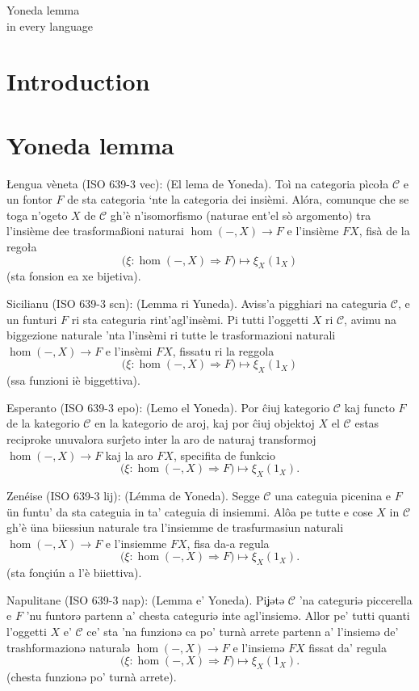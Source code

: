 \documentclass{article}
\def\faire{\todo[inline]{TODO!}}
\newcommand{\tran}[3]{%
	\noindent\textsf{#1:} (#2). #3%
	\medskip\newline
}
\begin{document}
\begin{center}
Yoneda lemma \\
in every language
\end{center}
\section{Introduction}
\faire
\section{Yoneda lemma}
\faire

\tran{{\L}engua vèneta (ISO 639-3 vec)}{El lema de Yoneda}{
	Toì na categoria pìco{\l}a $\mathcal C$ e un fontor $F$ de sta categoria `nte la categoria dei insièmi. Al\'ora, comunque che se toga n'ogeto $X$ de $\mathcal C$ gh'è n'isomorfismo (naturae ent'el sò argomento) tra l'insième dee trasforma{\ss}ioni naturai $\hom(-,X)\to F$ e l'insième $FX$, fisà de la rego{\l}a
	\[
	\Big(\xi : \hom(-,X)\Rightarrow F\Big) \mapsto \xi_X(1_X)
	\]
	(sta fonsion ea xe bijetiva).
}
\tran{Sicilianu (ISO 639-3 scn)}{Lemma ri Yuneda}{
	Aviss'a pigghiari na categuria $\mathcal C$, e un funturi $F$ ri sta categuria rint'agl'insèmi. Pi tutti l'oggetti $X$ ri $\mathcal C$, avimu na biggezione naturale 'nta l'insèmi ri tutte le trasformazioni naturali $\hom(-,X)\to F$ e l'insèmi $FX$, fissatu ri la reggola
	\[
		\Big(\xi : \hom(-,X)\Rightarrow F\Big) \mapsto \xi_X(1_X)
	\]
	(ssa funzioni iè biggettiva).
}
\tran{Esperanto (ISO 639-3 epo)}{Lemo el Yoneda}{
	Por \^{c}iuj kategorio $\mathcal C$ kaj functo $F$ de la kategorio $\mathcal C$ en la kategorio de aroj, kaj por \^{c}iuj objektoj $X$ el $\mathcal C$ estas reciproke unuvalora sur\^{j}eto inter la aro de naturaj transformoj $\hom(-,X)\to F$ kaj la aro $FX$, specifita de funkcio
	\[
		\Big(\xi : \hom(-,X)\Rightarrow F\Big) \mapsto \xi_X(1_X).
	\]
}
\tran{Zenéise (ISO 639-3 lij)}{Lémma de Yoneda}{
	Segge $\mathcal C$ una categuia picenina e $F$ ün funtu' da sta categuia in ta' categuia di insiemmi. Al\^{o}a pe tutte e cose $X$ in $\mathcal C$ gh'è üna biiessiun naturale tra l'insiemme de trasfurmasiun naturali $\hom(-,X)\to F$ e l'insiemme $FX$, fisa da-a regula
    \[
		\Big(\xi : \hom(-,X)\Rightarrow F\Big) \mapsto \xi_X(1_X).
	\]
    (sta fonçiún a l'è biiettiva).
}
\tran{Napulitane (ISO 639-3 nap)}{Lemma e' Yoneda}{
	Piʝətə $\mathcal C$ 'na categuriə piccerella e $F$ 'nu funtorə partenn a' chesta categuriə inte agl'insiemə. Allor pe' tutti quanti l'oggetti $X$ e' $\mathcal C$ ce' sta 'na funzionə ca po' turnà arrete partenn a' l'insiemə de' trashformazionə naturalə $\hom(-,X)\to F$ e l'insiemə $FX$ fissat da' regula
	\[
		\Big(\xi : \hom(-,X)\Rightarrow F\Big) \mapsto \xi_X(1_X).
	\]
  (chesta funzionə po' turnà arrete).
}
\end{document}
